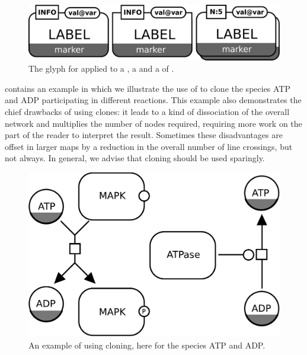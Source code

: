 \begin{figure}[H]
  \centering
  \includegraphics[scale = 0.3]{images/labeledCloneMarker}
  \caption{The \PD glyph for  applied to a , a  and a  of .}
  \label{fig:labeledCloneMarker}
\end{figure}

 contains an example in which we illustrate the use of  to clone the species ATP and ADP participating in different reactions.  This example also demonstrates the chief drawbacks of using clones: it leads to a kind of dissociation of the overall network and multiplies the number of nodes required, requiring more work on the part of the reader to interpret the result.  Sometimes these disadvantages are offset in larger maps by a reduction in the overall number of line crossings, but not always.  In general, we advise that cloning should be used sparingly.

\begin{figure}[H]
  \centering
  \includegraphics[scale = 0.5]{examples/cloning}
  \caption{An example of using cloning, here for the species ATP and ADP.}
  \label{fig:example-cloning}
\end{figure}




